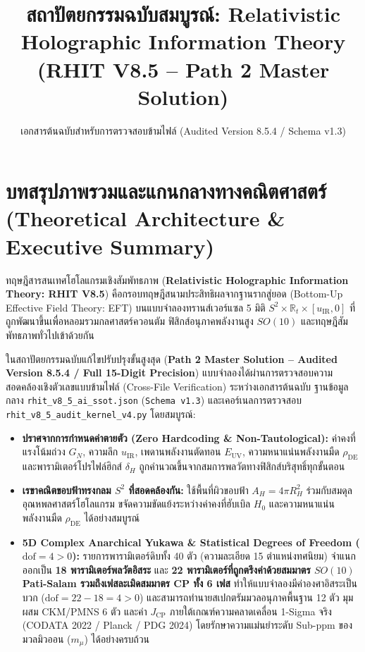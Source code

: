 \documentclass[11pt, a4paper]{article}
\title{\textbf{\color{primary}สถาปัตยกรรมฉบับสมบูรณ์: Relativistic Holographic Information Theory (RHIT V8.5 -- Path 2 Master Solution)}}
\author{เอกสารต้นฉบับสำหรับการตรวจสอบข้ามไฟล์ (Audited Version 8.5.4 / Schema v1.3)}
\date{}
\begin{document}
\maketitle

\section{บทสรุปภาพรวมและแกนกลางทางคณิตศาสตร์ (Theoretical Architecture \& Executive Summary)}

ทฤษฎีสารสนเทศโฮโลแกรมเชิงสัมพัทธภาพ (\textbf{Relativistic Holographic Information Theory: RHIT V8.5}) คือกรอบทฤษฎีสนามประสิทธิผลจากฐานรากสู่ยอด (Bottom-Up Effective Field Theory: EFT) บนแบบจำลองทรานส์เวอร์แซล 5 มิติ $S^2 \times \mathbb{R}_t \times [u_{\text{IR}}, 0]$ ที่ถูกพัฒนาขึ้นเพื่อหลอมรวมกลศาสตร์ควอนตัม ฟิสิกส์อนุภาคพลังงานสูง $SO(10)$ และทฤษฎีสัมพัทธภาพทั่วไปเข้าด้วยกัน

ในสถาปัตยกรรมฉบับแก้ไขปรับปรุงขั้นสูงสุด (\textbf{Path 2 Master Solution -- Audited Version 8.5.4 / Full 15-Digit Precision}) แบบจำลองได้ผ่านการตรวจสอบความสอดคล้องเชิงตัวเลขแบบข้ามไฟล์ (Cross-File Verification) ระหว่างเอกสารต้นฉบับ ฐานข้อมูลกลาง \texttt{rhit\_v8\_5\_ai\_ssot.json} (\texttt{Schema v1.3}) และเคอร์เนลการตรวจสอบ \texttt{rhit\_v8\_5\_audit\_kernel\_v4.py} โดยสมบูรณ์:

\begin{itemize}
    \item \textbf{ปราศจากการกำหนดค่าตายตัว (Zero Hardcoding \& Non-Tautological):} ค่าคงที่แรงโน้มถ่วง $G_N$, ความลึก $u_{\text{IR}}$, เพดานพลังงานตัดทอน $E_{\text{UV}}$, ความหนาแน่นพลังงานมืด $\rho_{\text{DE}}$ และพารามิเตอร์โปรไฟล์ฮิกส์ $\delta_H$ ถูกคำนวณขึ้นจากสมการพลวัตทางฟิสิกส์บริสุทธิ์ทุกขั้นตอน
    \item \textbf{เรขาคณิตขอบฟ้าทรงกลม $S^2$ ที่สอดคล้องกัน:} ใช้พื้นที่ผิวขอบฟ้า $A_H = 4\pi R_H^2$ ร่วมกับสมดุลอุณหพลศาสตร์โฮโลแกรม ขจัดความขัดแย้งระหว่างค่าคงที่ฮับเบิล $H_0$ และความหนาแน่นพลังงานมืด $\rho_{\text{DE}}$ ได้อย่างสมบูรณ์
    \item \textbf{5D Complex Anarchical Yukawa \& Statistical Degrees of Freedom ($\text{dof} = 4 > 0$):} รายการพารามิเตอร์ดิบทั้ง 40 ตัว (ความละเอียด 15 ตำแหน่งทศนิยม) จำแนกออกเป็น \textbf{18 พารามิเตอร์พลวัตอิสระ} และ \textbf{22 พารามิเตอร์ที่ถูกตรึงค่าด้วยสมมาตร $SO(10)$ Pati-Salam รวมถึงเฟสละเมิดสมมาตร CP ทั้ง 6 เฟส} ทำให้แบบจำลองมีค่าองศาอิสระเป็นบวก ($\text{dof} = 22 - 18 = 4 > 0$) และสามารถทำนายสเปกตรัมมวลอนุภาคพื้นฐาน 12 ตัว มุมผสม CKM/PMNS 6 ตัว และค่า $J_{\text{CP}}$ ภายใต้เกณฑ์ความคลาดเคลื่อน 1-Sigma จริง (CODATA 2022 / Planck / PDG 2024) โดยรักษาความแม่นยำระดับ Sub-ppm ของมวลมิวออน ($m_\mu$) ได้อย่างครบถ้วน
\end{itemize}
\end{document}
